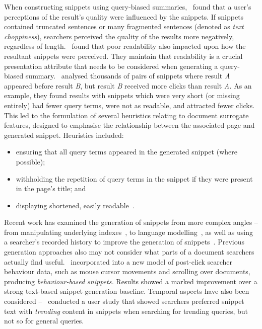 When constructing snippets using query-biased summaries,~\cite{rose2007snippet_attributes} found that a user's perceptions of the result's quality were influenced by the snippets. If snippets contained truncated sentences or many fragmented sentences (denoted as \emph{text choppiness}), searchers perceived the quality of the results more negatively, regardless of length.~\cite{kanungo2009snippet_readability} found that poor readability also impacted upon how the resultant snippets were perceived. They maintain that readability is a crucial presentation attribute that needs to be considered when generating a query-biased summary.~\cite{clarke2007caption_features} analysed thousands of pairs of snippets where result \emph{A} appeared before result \emph{B}, but result \emph{B} received more clicks than result \emph{A.} As an example, they found results with snippets which were very short (or missing entirely) had fewer query terms, were not as readable, and attracted fewer clicks. This led to the formulation of several heuristics relating to document surrogate features, designed to emphasise the relationship between the associated page and generated snippet. Heuristics included:

\begin{itemize}
    \item{ensuring that all query terms appeared in the generated snippet (where possible);}
    \item{withholding the repetition of query terms in the snippet if they were present in the page's title; and}
    \item{displaying shortened, easily readable~.}
\end{itemize}

Recent work has examined the generation of snippets from more complex angles -- from manipulating underlying indexes~\citep{turpin2007fast_snippets, bast2014snippet_generation}, to language modelling~\citep{li2010snippet_extraction, he2012bridging}, as well as using a searcher's recorded history to improve the generation of snippets~\citep{ageev2013summaries, savenkov2011search}. Previous generation approaches also may not consider what parts of a document searchers actually find useful.~\cite{ageev2013summaries} incorporated into a new model of post-click searcher behaviour data, such as mouse cursor movements and scrolling over documents, producing \emph{behaviour-based snippets.} Results showed a marked improvement over a strong text-based snippet generation baseline. Temporal aspects have also been considered --~\cite{svore2012temporal_snippets} conducted a user study that showed searchers preferred snippet text with \emph{trending} content in snippets when searching for trending queries, but not so for general queries.

